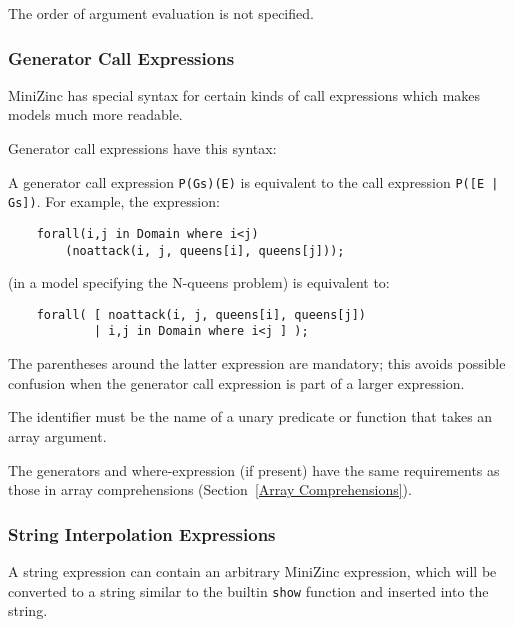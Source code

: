\documentclass[10pt]{scrartcl}
\begin{document}

The order of argument evaluation is not specified.  

\subsubsection{Generator Call Expressions}
        \label{Generator Call Expressions}
MiniZinc has special syntax for certain kinds of call expressions which makes
models much more readable.

Generator call expressions have this syntax:
\begin{productions}
    \RuleGenCallExpr
\end{productions}
%
A generator call expression \texttt{P(Gs)(E)} is equivalent to the call
expression \texttt{P([E | Gs])}.
For example, the expression:
\begin{verbatim}
    forall(i,j in Domain where i<j)
        (noattack(i, j, queens[i], queens[j]));
\end{verbatim}
(in a model specifying the N-queens problem) is equivalent to:
\begin{verbatim}
    forall( [ noattack(i, j, queens[i], queens[j])
            | i,j in Domain where i<j ] );
\end{verbatim}

The parentheses around the latter expression are mandatory;  this avoids
possible confusion when the generator call expression is part of a larger
expression.

The identifier must be the name of a unary predicate or function that takes
an array argument.

The generators and where-expression (if present) have the same requirements
as those in array comprehensions (Section~\ref{Array Comprehensions}).

\subsubsection{String Interpolation Expressions}
        \label{String Interpolation Expressions}
A string expression can contain an arbitrary MiniZinc expression, which will be converted to a string similar to the builtin \texttt{show} function and inserted into the string.
\end{document}
